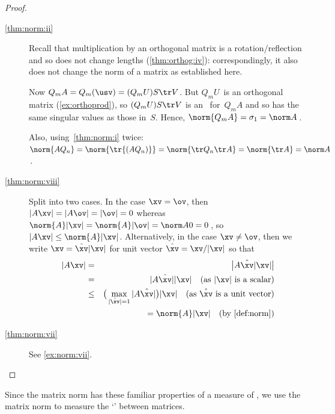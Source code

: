 \begin{proof}
\begin{description}
\item[\ref{thm:norm:ii}]
Recall that multiplication by an orthogonal matrix is a rotation\slash reflection and so does not change lengths (\cref{thm:orthog:iv}): correspondingly, it also does not change the norm of a matrix as established here.

Now \(Q_mA=Q_m(\usv)=(Q_mU)S\tr V\).
But \(Q_mU\)~is an orthogonal matrix (\cref{ex:orthoprod}),
so \((Q_mU)S\tr V\) is an \svd\ for~\(Q_mA\) and so has the same singular values as those in~\(S\).
Hence, \(\norm{Q_mA}=\sigma_1=\norm A\)\,.

Also, using~\ref{thm:norm:i} twice: \(\norm{AQ_n}=\norm{\tr{(AQ_n)}}=\norm{\tr Q_n\tr A}=\norm{\tr A}=\norm A\)\,.

\item[\ref{thm:norm:viii}]
Split into two cases.
In the case \(\xv=\ov\), then \(|A\xv|=|A\ov|=|\ov|=0\) whereas \(\norm{A}|\xv|=\norm{A}|\ov|=\norm A0=0\)\,, so \(|A\xv|\leq\norm{A}|\xv|\).
Alternatively, in the case \(\xv\neq\ov\), then we write \(\xv=\hat{\xv}|\xv|\) for unit vector \(\hat{\xv}=\xv/|\xv|\)  so that
\begin{eqnarray*}
|A\xv|&=&\big|A\hat{\xv}|\xv|\big|
\\&=&|A\hat{\xv}||\xv| \quad(\text{as }|\xv|\text{ is a scalar})
\\&\leq&\big(\max_{|\hat{\xv}|=1}|A\hat{\xv}|\big)|\xv|
\quad(\text{as }\hat{\xv}\text{ is a unit vector})
\\&&{}=\norm{A}|\xv|\quad(\text{by \cref{def:norm}})
\end{eqnarray*}


\item[\ref{thm:norm:vii}] See \cref{ex:norm:vii}.
\end{description}
\end{proof}




Since the matrix norm has these familiar properties of a measure of , we use the matrix norm to measure the `' between matrices.

